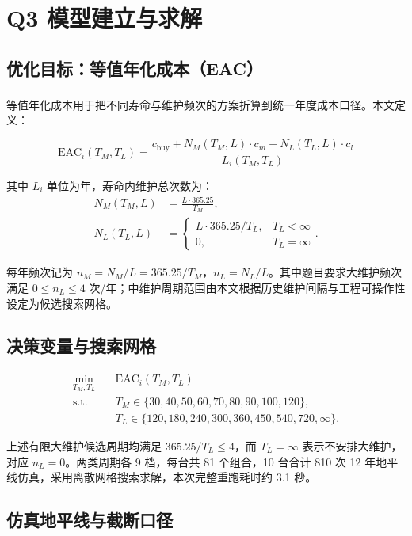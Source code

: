 \documentclass[12pt, a4paper, fontset=fandol]{ctexart}
\let\oldcite\cite
\renewcommand{\cite}[1]{\textsuperscript{\oldcite{#1}}}
\theoremstyle{definition}
\begin{document}
\section{Q3 模型建立与求解}

\subsection{优化目标：等值年化成本（EAC）}

等值年化成本用于把不同寿命与维护频次的方案折算到统一年度成本口径\cite{eac,eng_econ_cn}。本文定义：

\begin{equation}
\mathrm{EAC}_i(T_M, T_L) = \frac{c_{\text{buy}} + N_M(T_M, L) \cdot c_m + N_L(T_L, L) \cdot c_l}{L_i(T_M, T_L)}
\label{eq:EAC}
\end{equation}

其中 $L_i$ 单位为年，寿命内维护总次数为：
\begin{align}
N_M(T_M, L) &= \frac{L \cdot 365.25}{T_M}, \\
N_L(T_L, L) &= \begin{cases} L \cdot 365.25 / T_L, & T_L < \infty \\ 0, & T_L = \infty \end{cases}.
\end{align}

每年频次记为 $n_M = N_M / L = 365.25 / T_M$，$n_L = N_L / L$。其中题目要求大维护频次满足 $0 \le n_L \le 4$ 次/年；中维护周期范围由本文根据历史维护间隔与工程可操作性设定为候选搜索网格。

\subsection{决策变量与搜索网格}

\begin{align}
\min_{T_M, T_L} \quad & \mathrm{EAC}_i(T_M, T_L) \\
\text{s.t.} \quad & T_M \in \{30,40,50,60,70,80,90,100,120\}, \\
& T_L \in \{120,180,240,300,360,450,540,720,\infty\}.
\end{align}

上述有限大维护候选周期均满足 $365.25/T_L \le 4$，而 $T_L=\infty$ 表示不安排大维护，对应 $n_L=0$。两类周期各 9 档，每台共 81 个组合，10 台合计 810 次 12 年地平线仿真，采用离散网格搜索求解，本次完整重跑耗时约 3.1 秒。

\subsection{仿真地平线与截断口径}
\end{document}
